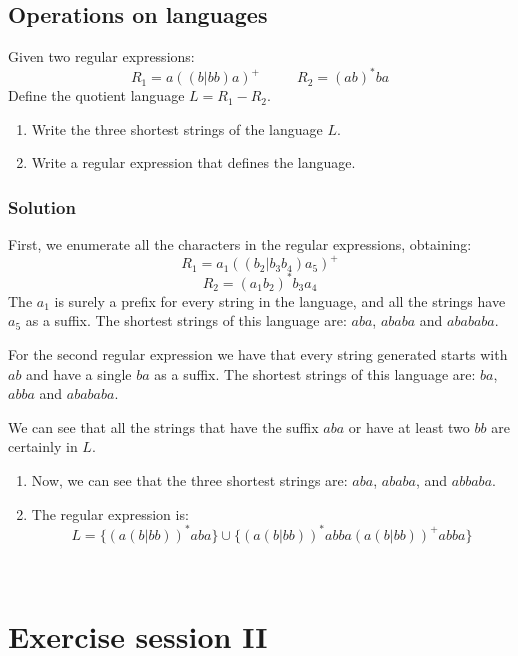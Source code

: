 \documentclass[12pt, a4paper]{report}
\begin{document}
    \section{Operations on languages}
        Given two regular expressions: 
        \[R_1=a((b|bb)a)^{+} \:\:\:\:\:\:\:\:\:\:\:\: R_2=(ab)^{*}ba\]
        Define the quotient language $L=R_1-R_2$. 
        \begin{enumerate}
            \item Write the three shortest strings of the language $L$.
            \item Write a regular expression that defines the language. 
        \end{enumerate}
    \subsection*{Solution}
        First, we enumerate all the characters in the regular expressions, obtaining: 
        \[R_1=a_1((b_2|b_3b_4)a_5)^{+}\]
        \[R_2=(a_1b_2)^{*}b_3a_4\]
        The $a_1$ is surely a prefix for every string in the language, and all the strings have $a_5$ as a suffix. The shortest strings of this language are: $aba$, $ababa$ and $abababa$. 
        
        For the second regular expression we have that every string generated starts with $ab$ and have a single $ba$ as a suffix. The shortest strings of this language are: $ba$, $abba$ and $abababa$. 
        
        We can see that all the strings that have the suffix $aba$ or have at least two $bb$ are certainly in $L$. 

        \begin{enumerate}
            \item Now, we can see that the three shortest strings are: $aba$, $ababa$, and $abbaba$. 
            \item The regular expression is: 
                \[L=\{(a(b|bb))^{*}aba\} \cup \{(a(b|bb))^{*}abba(a(b|bb))^{+}abba\}\]
        \end{enumerate}    
    
\newpage

\

\newpage

\chapter{Exercise session II}
\end{document}
